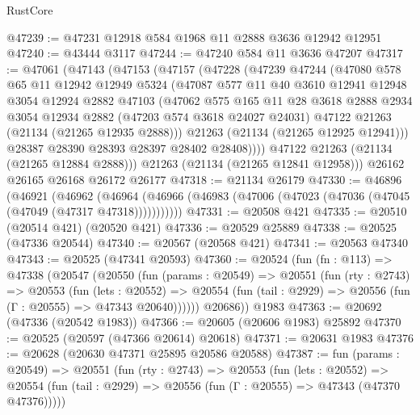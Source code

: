 \begin{lexlean}{RustCore}
\begin{coremodule}
@47239 := @47231 @12918 @584 @1968 @11 @2888 @3636 @12942 @12951
@47240 := @43444 @3117
@47244 := @47240 @584 @11 @3636 @47207
@47317 := @47061
    (@47143
      (@47153
        (@47157
          (@47228
            (@47239
              @47244
              (@47080
                @578
                @65
                @11
                @12942
                @12949
                @5324
                (@47087
                  @577
                  @11
                  @40
                  @3610
                  @12941
                  @12948
                  @3054
                  @12924
                  @2882
                  @47103
                  (@47062
                    @575
                    @165
                    @11
                    @28
                    @3618
                    @2888
                    @2934
                    @3054
                    @12934
                    @2882
                    (@47203 @574 @3618 @24027 @24031)
                    @47122
                    @21263
                    (@21134 (@21265 @12935 @2888)))
                  @21263
                  (@21134 (@21265 @12925 @12941)))
                @28387
                @28390
                @28393
                @28397
                @28402
                @28408))))
        @47122
        @21263
        (@21134 (@21265 @12884 @2888)))
      @21263
      (@21134 (@21265 @12841 @12958)))
    @26162
    @26165
    @26168
    @26172
    @26177
@47318 := @21134 @26179
@47330 := @46896
    (@46921
      (@46962
        (@46964 (@46966 (@46983 (@47006 (@47023 (@47036 (@47045 (@47049 (@47317 @47318)))))))))))
@47331 := @20508 @421
@47335 := @20510 (@20514 @421) (@20520 @421)
@47336 := @20529 @25889
@47338 := @20525 (@47336 @20544)
@47340 := @20567 (@20568 @421)
@47341 := @20563 @47340
@47343 := @20525 (@47341 @20593)
@47360 := @20524
    (fun (fn : @113) =>
    @47338
      (@20547
        (@20550
          (fun (params : @20549) =>
          @20551
            (fun (rty : @2743) =>
            @20553
              (fun (lets : @20552) =>
              @20554 (fun (tail : @2929) => @20556 (fun (Γ : @20555) => @47343 @20640))))))
        @20686))
    @1983
@47363 := @20692 (@47336 (@20542 @1983))
@47366 := @20605 (@20606 @1983) @25892
@47370 := @20525 (@20597 (@47366 @20614) @20618)
@47371 := @20631 @1983
@47376 := @20628 (@20630 @47371 @25895 @20586 @20588)
@47387 := fun (params : @20549) =>
  @20551
    (fun (rty : @2743) =>
    @20553
      (fun (lets : @20552) =>
      @20554 (fun (tail : @2929) => @20556 (fun (Γ : @20555) => @47343 (@47370 @47376)))))

\end{coremodule}
\end{lexlean}
